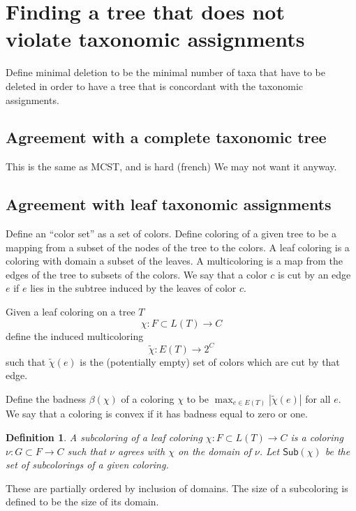 \documentclass{amsart}
\newcommand{\col}{\chi}
\newcommand{\colt}{\tilde{\chi}}
\newcommand{\subcolS}{\mathsf{Sub}}
\newcommand{\bad}{\beta}
\newtheorem{defn}{Definition}
\begin{document}

\section{Finding a tree that does not violate taxonomic assignments}
Define minimal deletion to be the minimal number of taxa that have to be deleted in order to have a tree that is concordant with the taxonomic assignments.

\subsection{Agreement with a complete taxonomic tree}
This is the same as MCST, and is hard (french)
We may not want it anyway.

\subsection{Agreement with leaf taxonomic assignments}

Define an ``color set'' as a set of colors.
Define coloring of a given tree to be a mapping from a subset of the nodes of the tree to the colors.
A leaf coloring is a coloring with domain a subset of the leaves.
A multicoloring is a map from the edges of the tree to subsets of the colors.
We say that a color $c$ is cut by an edge $e$ if $e$ lies in the subtree induced by the leaves of color $c$.

Given a leaf coloring on a tree $T$
\[
\col: F \subset L(T) \rightarrow C
\]
define the induced multicoloring
\[
\colt: E(T) \rightarrow 2^C
\]
such that $\colt(e)$ is the (potentially empty) set of colors which are cut by that edge.

Define the badness $\bad(\col)$ of a coloring $\col$ to be $\max_{e \in E(T)} |\colt(e)| $ for all $e$.
We say that a coloring is convex if it has badness equal to zero or one.

\begin{defn}
  A subcoloring of a leaf coloring $\col: F \subset L(T) \rightarrow C$ is a coloring $\nu: G \subset F \rightarrow C$ such that $\nu$ agrees with $\col$ on the domain of $\nu$.
  Let $\subcolS(\col)$ be the set of subcolorings of a given coloring.
\end{defn}
These are partially ordered by inclusion of domains.
The size of a subcoloring is defined to be the size of its domain.
\end{document}
